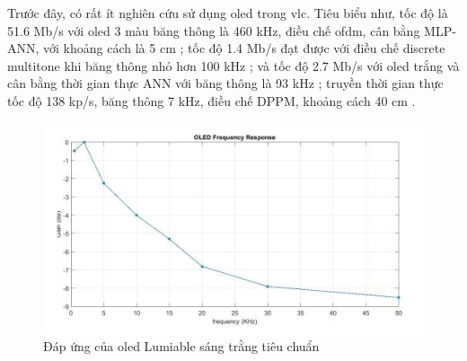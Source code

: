 Trước đây, có rất ít nghiên cứu sử dụng \ac{oled} trong \ac{vlc}. Tiêu biểu như, tốc độ là 51.6 Mb/s với \ac{oled} 3 màu băng thông là 460 kHz, điều chế \ac{ofdm}, cân bằng MLP-ANN, với khoảng cách là 5 cm \cite{vlc-oled-51.6Mbps}; tốc độ 1.4 Mb/s đạt được với điều chế discrete multitone khi băng thông nhỏ hơn 100 kHz \cite{vlc-oled-1.4Mbps}; và tốc độ 2.7 Mb/s với \ac{oled} trắng và cân bằng thời gian thực ANN với băng thông là 93 kHz \cite{vlc-oled-2.7Mbps}; truyền thời gian thực tốc độ 138 kp/s, băng thông 7 kHz, điều chế DPPM, khoảng cách 40 cm \cite{vlc-oled-138kbps}.  
\begin{figure} [ht]
	\centering
	\captionsetup{justification=centering}
	\includegraphics [scale=1] {Image/OLED_frequency_response}
	\caption{Đáp ứng của \ac{oled} Lumiable sáng trằng tiêu chuẩn}
\end{figure}
